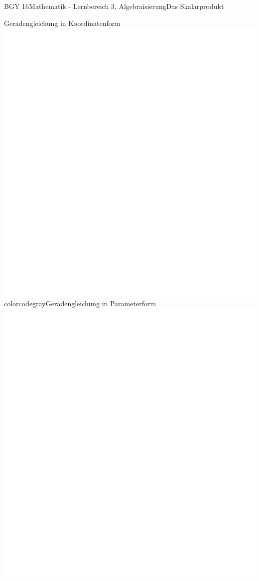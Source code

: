 \documentclass[oneside,openany,headings=optiontotoc,11pt,numbers=noenddot]{scrreprt}
\begin{document}
\begin{worksheet}{BGY 16}{Mathematik - Lernbereich 3, Algebraisierung}{Das Skalarprodukt}
\begin{framed}
		\end{framed}
		\begin{framed}
			\tiny{\color{codegray}Geradengleichung in Koordinatenform}\\
			\includegraphics[scale=0.44]{../empty.jpg}\\
			\tiny{color{codegray}Geradengleichung in Parameterform}\\
			\includegraphics[scale=1.14]{../empty.jpg}

\end{framed}
\end{worksheet}
\end{document}
